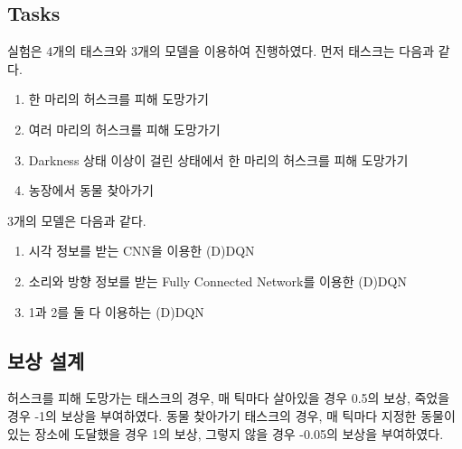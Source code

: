 \documentclass{tudelftposter}
\begin{document}


\subsection{Tasks}
실험은 4개의 태스크와 3개의 모델을 이용하여 진행하였다. 먼저 태스크는 다음과 같다.
\begin{enumerate}
  \item 한 마리의 허스크를 피해 도망가기
  \item 여러 마리의 허스크를 피해 도망가기
  \item Darkness 상태 이상이 걸린 상태에서 한 마리의 허스크를 피해 도망가기
  \item 농장에서 동물 찾아가기
\end{enumerate}
3개의 모델은 다음과 같다.
\begin{enumerate}
  \item 시각 정보를 받는 CNN을 이용한 (D)DQN
  \item 소리와 방향 정보를 받는 Fully Connected Network를 이용한 (D)DQN
  \item 1과 2를 둘 다 이용하는 (D)DQN
\end{enumerate}

\subsection{보상 설계}
허스크를 피해 도망가는 태스크의 경우, 매 틱마다 살아있을 경우 0.5의 보상, 죽었을 경우 -1의 보상을 부여하였다. 동물 찾아가기 태스크의 경우, 매 틱마다 지정한 동물이 있는 장소에 도달했을 경우 1의 보상, 그렇지 않을 경우 -0.05의 보상을 부여하였다.
\end{document}

